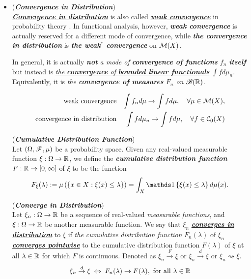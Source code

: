 \documentclass[11pt]{article}
\begin{document}
\begin{itemize}
\item \begin{example} (\emph{\textbf{Convergence in Distribution}})\\
\underline{\emph{\textbf{Convergence in distribution}}} is also called \underline{\emph{\textbf{weak convergence}}} in probability theory \citep{folland2013real}. In functional analysis, however, \emph{\textbf{weak convergence}} is actually reserved for a different mode of convergence, while \emph{\textbf{the convergence in distribution}} is \emph{\textbf{the weak$^*$ convergence}} on ${\mathcal M}(X)$.

In general, it is actually \emph{\textbf{not} a mode of \textbf{convergence of functions} $f_n$ \textbf{itself}} but instead is \underline{\emph{the \textbf{convergence} of \textbf{bounded linear functionals}}} $\int f d\mu_n$. Equivalently, it is \emph{the \textbf{convergence of measures} $F_n$ on ${\mathscr B}({\mathbb R})$}.

\begin{align*}
 \text{weak convergence} && \int f_n d\mu \rightarrow \int f d\mu, \quad \forall \mu \in {\mathcal M}(X), \\
\text{convergence in distribution}  &&  \int f d\mu_n \rightarrow \int f d\mu, \quad \forall f \in {\mathcal C}_{0}(X)
\end{align*}

\begin{definition} (\emph{\textbf{Cumulative Distribution Function}}) \citep{van2000asymptotic} \\
Let $(\Omega,{\mathscr F}, \mu)$ be a probability space. Given any real-valued measurable function $\xi : \Omega \rightarrow {\mathbb R}$, we define the \emph{\textbf{cumulative distribution function}} $F : {\mathbb R} \rightarrow [0, \infty]$ of $\xi$ to be the function
\begin{align*}
F_{\xi}(\lambda) :=  \mu\paren{\set{x \in  X : \xi(x) \le \lambda}} = \int_{X} \ind{\xi(x) \le \lambda}d\mu(x).
\end{align*}
\end{definition}

\begin{definition}  (\emph{\textbf{Converge in Distribution}}) \citep{van2000asymptotic}\\
Let $\xi_n : \Omega \rightarrow {\mathbb R}$ be a sequence of real-valued \emph{measurable functions}, and $\xi: \Omega \rightarrow {\mathbb R}$ be another measurable function. We say that $\xi_n$ \underline{\emph{\textbf{converges in distribution}}} to $\xi$ if \emph{the cumulative distribution function} $F_n(\lambda)$ of $\xi_n$
\underline{\emph{\textbf{converges pointwise}}} to the cumulative distribution function $F(\lambda)$ of $\xi$ at all $\lambda \in  {\mathbb R}$ for which $F$ is continuous. Denoted as $\xi_{n}\stackrel{F}{\rightarrow} \xi$ or \underline{$\xi_{n}\stackrel{d}{\rightarrow} \xi$} or \underline{$\xi_n \rightsquigarrow \xi$}. 
\begin{align*}
\xi_{n}\stackrel{d}{\rightarrow} \xi \; \Leftrightarrow \; F_n(\lambda) \rightarrow F(\lambda), \text{ for all }\lambda \in {\mathbb R}
\end{align*}
\end{definition}


\end{example}
\end{itemize}
\end{document}
